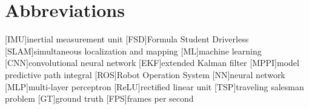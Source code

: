 \chapter{Abbreviations}

\begin{acronym}[AAPC]
	[IMU]{inertial measurement unit}
	[FSD]{Formula Student Driverless}
	[SLAM]{simultaneous localization and mapping}
	[ML]{machine learning}
	[CNN]{convolutional neural network}
	[EKF]{extended Kalman filter}
	[MPPI]{model predictive path integral}
	[ROS]{Robot Operation System}
	[NN]{neural network}
	[MLP]{multi-layer perceptron}
	[ReLU]{rectified linear unit}
	[TSP]{traveling salesman problem} 
	[GT]{ground truth} 
	[FPS]{frames per second}

\end{acronym}